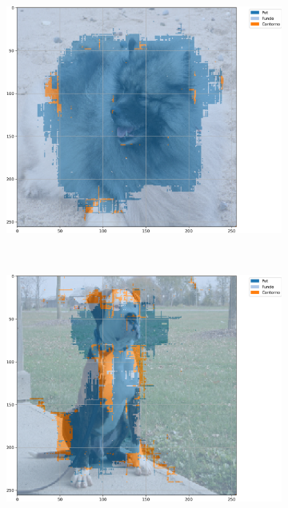 \begin{figure}[H]
    \centering
    \caption[Segmentação com U-Net-\textit{Like}, BPCAPooling, 20 épocas, \textit{Oxford-IIIT Pets}, mIoU.]{Exemplos segmentados a partir de U-Net-\textit{Like} com BPCAPooling e 20 épocas no conjunto de dados \textit{Oxford-IIIT Pets} baseada em mIoU.}
    \label{results:fig:semantic:14}
     \begin{subfigure}[t]{0.32\textwidth}
         \centering
         \includegraphics[width=1\linewidth]{recursos/imagens/results/bpca_miou_unetlie500_image_0_overlayed_segmentation.png}
         \label{results:fig:semantic:14.1}
     \end{subfigure}%
     ~ 
     \begin{subfigure}[t]{0.32\textwidth}
         \centering
         \includegraphics[width=1\linewidth]{recursos/imagens/results/bpca_miou_unetlie500_image_1_overlayed_segmentation.png}

\end{subfigure}
\end{figure}
